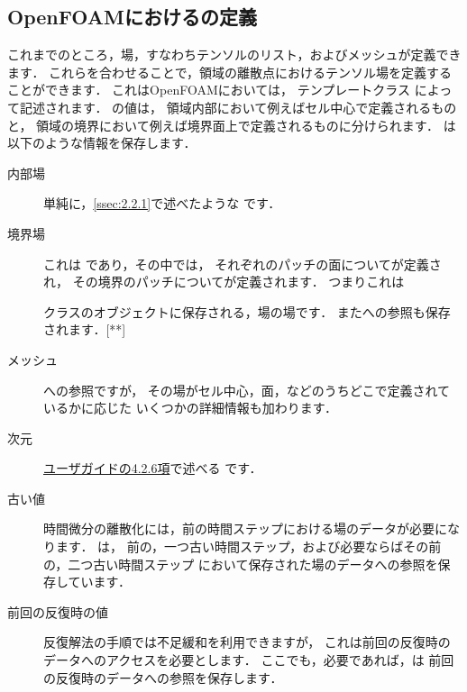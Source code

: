 \subsection{OpenFOAMにおけるの定義}
\label{ssec:2.3.2}
これまでのところ，場，すなわちテンソルのリスト，およびメッシュが定義できます．
これらを合わせることで，領域の離散点におけるテンソル場を定義することができます．
これはOpenFOAMにおいては，
%
%
テンプレートクラス
によって記述されます．
の値は，
領域内部において例えばセル中心で定義されるものと，
領域の境界において例えば境界面上で定義されるものに分けられます．
は以下のような情報を保存します．
\begin{description}
 \item[内部場] 単純に，\autoref{ssec:2.2.1}で述べたような
            です．
 \item[境界場] これは
%
%
            であり，その中では，
            それぞれのパッチの面についてが定義され，
            その境界のパッチについてが定義されます．
            つまりこれは

クラスのオブジェクトに保存される，場の場です．
            またへの参照も保存されます．[**]
 \item[メッシュ] への参照ですが，
            その場がセル中心，面，などのうちどこで定義されているかに応じた
            いくつかの詳細情報も加わります．
 \item[次元] \href{UserGuideJa.pdf#subsection.4.2.6}{ユーザガイドの4.2.6項}で述べる
%
%
            です．
 \item[古い値] 時間微分の離散化には，前の時間ステップにおける場のデータが必要になります．
%
%
            は，
            前の，一つ古い時間ステップ，および必要ならばその前の，二つ古い時間ステップ
            において保存された場のデータへの参照を保存しています．
 \item[前回の反復時の値] 反復解法の手順では不足緩和を利用できますが，
            これは前回の反復時のデータへのアクセスを必要とします．
            ここでも，必要であれば，は
            前回の反復時のデータへの参照を保存します．
\end{description}
